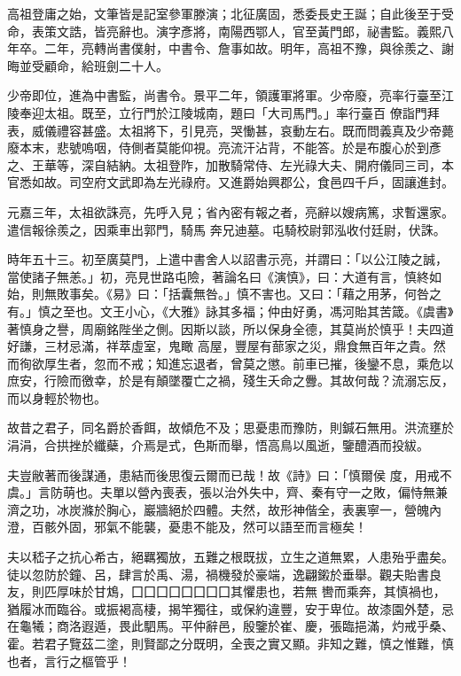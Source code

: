 \begin{pinyinscope}
 高祖登庸之始，文筆皆是記室參軍滕演；北征廣固，悉委長史王誕；自此後至于受命，表策文誥，皆亮辭也。演字彥將，南陽西鄂人，官至黃門郎，祕書監。義熙八年卒。二年，亮轉尚書僕射，中書令、詹事如故。明年，高祖不豫，與徐羨之、謝晦並受顧命，給班劍二十人。



 少帝即位，進為中書監，尚書令。景平二年，領護軍將軍。少帝廢，亮率行臺至江陵奉迎太祖。既至，立行門於江陵城南，題曰「大司馬門。」率行臺百
 僚詣門拜表，威儀禮容甚盛。太祖將下，引見亮，哭慟甚，哀動左右。既而問義真及少帝薨廢本末，悲號嗚咽，侍側者莫能仰視。亮流汗沾背，不能答。於是布腹心於到彥之、王華等，深自結納。太祖登阼，加散騎常侍、左光祿大夫、開府儀同三司，本官悉如故。司空府文武即為左光祿府。又進爵始興郡公，食邑四千戶，固讓進封。



 元嘉三年，太祖欲誅亮，先呼入見；省內密有報之者，亮辭以嫂病篤，求暫還家。遣信報徐羨之，因乘車出郭門，騎馬
 奔兄迪墓。屯騎校尉郭泓收付廷尉，伏誅。



 時年五十三。初至廣莫門，上遣中書舍人以詔書示亮，并謂曰：「以公江陵之誠，當使諸子無恙。」初，亮見世路屯險，著論名曰《演慎》，曰：大道有言，慎終如始，則無敗事矣。《易》曰：「括囊無咎。」慎不害也。又曰：「藉之用茅，何咎之有。」慎之至也。文王小心，《大雅》詠其多福；仲由好勇，馮河貽其苦箴。《虞書》著慎身之譽，周廟銘陛坐之側。因斯以談，所以保身全德，其莫尚於慎乎！夫四道好謙，三材忌滿，祥萃虛室，鬼瞰
 高屋，豐屋有蔀家之災，鼎食無百年之貴。然而徇欲厚生者，忽而不戒；知進忘退者，曾莫之懲。前車已摧，後鑾不息，乘危以庶安，行險而徼幸，於是有顛墜覆亡之禍，殘生夭命之釁。其故何哉？流溺忘反，而以身輕於物也。



 故昔之君子，同名爵於香餌，故傾危不及；思憂患而豫防，則鍼石無用。洪流壅於涓涓，合拱挫於纖蘗，介焉是式，色斯而舉，悟高鳥以風逝，鑒醴酒而投紱。



 夫豈敝著而後謀通，患結而後思復云爾而已哉！故《詩》曰：「慎爾侯
 度，用戒不虞。」言防萌也。夫單以營內喪表，張以治外失中，齊、秦有守一之敗，偏恃無兼濟之功，冰炭滌於胸心，巖牆絕於四體。夫然，故形神偕全，表裏寧一，營魄內澄，百骸外固，邪氣不能襲，憂患不能及，然可以語至而言極矣！



 夫以嵇子之抗心希古，絕羈獨放，五難之根既拔，立生之道無累，人患殆乎盡矣。徒以忽防於鐘、呂，肆言於禹、湯，禍機發於豪端，逸翩鎩於垂舉。觀夫貽書良友，則匹厚味於甘鴆，囗囗囗囗囗囗囗囗其懼患也，若無
 轡而乘奔，其慎禍也，猶履冰而臨谷。或振褐高棲，揭竿獨往，或保約違豐，安于卑位。故漆園外楚，忌在龜犧；商洛遐遁，畏此駟馬。平仲辭邑，殷鑒於崔、慶，張臨挹滿，灼戒乎桑、霍。若君子覽茲二塗，則賢鄙之分既明，全喪之實又顯。非知之難，慎之惟難，慎也者，言行之樞管乎！




\end{pinyinscope}
